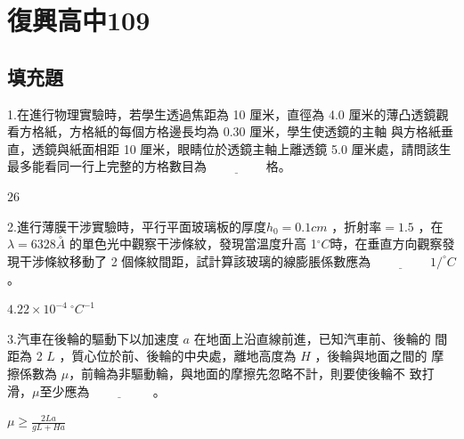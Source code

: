 \documentclass[cn,10pt,math=newtx,chinesefont=founder,device=ig]{elegantbook}
\begin{document}
\newpage


\chapter{復興高中109}
\section{填充題}

\begin{example}
   1.在進行物理實驗時，若學生透過焦距為 10 厘米，直徑為 4.0 厘米的薄凸透鏡觀看方格紙，方格紙的每個方格邊長均為 0.30 厘米，學生使透鏡的主軸
與方格紙垂直，透鏡與紙面相距 10 厘米，眼睛位於透鏡主軸上離透鏡 5.0
厘米處，請問該生最多能看同一行上完整的方格數目為$\underline{\hspace{2cm}}$格。\\
    \rightline{[復興高中教甄109]}
\end{example}
\begin{solution}
    $26$
\end{solution}

\newpage


\begin{example}
   2.進行薄膜干涉實驗時，平行平面玻璃板的厚度$ℎ_0= 0.1cm$ ，折射率$=1.5$ ，在
$\lambda = 6328 \overset{\circ}{A}$ 的單色光中觀察干涉條紋，發現當溫度升高 1$^\circ C$時，在垂直方向觀察發現干涉條紋移動了 2 個條紋間距，試計算該玻璃的線膨脹係數應為$\underline{\hspace{2cm}} 1/^\circ C$。\\
    \rightline{[復興高中教甄109]}
\end{example}
\begin{solution}
    $4.22 \times 10^{-4} \ ^{\circ} C^{-1}$
\end{solution}

\newpage


\begin{example}
   3.汽車在後輪的驅動下以加速度 $a$ 在地面上沿直線前進，已知汽車前、後輪的
間距為 2 $L$ ，質心位於前、後輪的中央處，離地高度為 $H$ ，後輪與地面之間的
摩擦係數為 $\mu$，前輪為非驅動輪，與地面的摩擦先忽略不計，則要使後輪不
致打滑，$\mu$至少應為$\underline{\hspace{2cm}}$ 。\\
    \rightline{[復興高中教甄109]}
\end{example}
\begin{solution}
    $\mu \ge \frac{2La}{gL+Ha}$
\end{solution}
\end{document}
